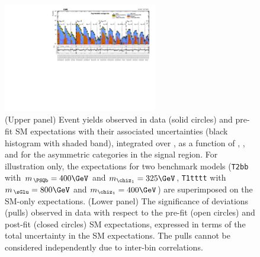 \begin{figure}[!h]
  \begin{center}
    \includegraphics[angle=90,width=0.60\textwidth]{figures/result/v4/summaryPlot_Asymmetric_prefit_overlay_fit_b}
    \caption{(Upper panel) Event yields observed in data (solid
      circles) and pre-fit SM expectations with their associated
      uncertainties (black histogram with shaded band), integrated
      over \HTmiss, as a function of \njet, \nb, and \scalht for the
      asymmetric \njet categories in the signal region. For
      illustration only, the expectations for two benchmark models
      (\texttt{T2bb} with $m_{\,\PSQb} = 400\GeV$ and $m_{\chiz_1} =
      325\GeV$, \texttt{T1tttt} with $m_{\,\sGlu} = 800\GeV$ and
      $m_{\chiz_1} = 400\GeV$) are superimposed on the SM-only
      expectations. (Lower panel) The significance of deviations
      (pulls) observed in data with respect to the pre-fit (open
      circles) and post-fit (closed circles) SM expectations,
      expressed in terms of the total uncertainty in the SM
      expectations. The pulls cannot be considered independently due
      to inter-bin correlations.}
    \label{fig:asym}
  \end{center}
\end{figure}

